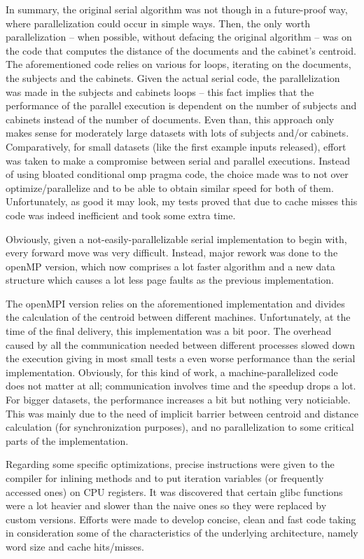 \documentclass[times, 10pt,twocolumn]{article}
\begin{document}
	In summary, the original serial algorithm was not though in a future-proof way, where parallelization could occur in simple ways.
	Then, the only worth parallelization – when possible, without defacing the original algorithm –  was on the code that computes the distance of the documents and the cabinet's centroid. The aforementioned code relies on various for loops, iterating on the documents, the subjects and the cabinets. Given the actual serial code, the parallelization was made in the subjects and cabinets loops – this fact implies that the performance of the parallel execution is dependent on the number of subjects and cabinets instead of the number of documents. Even than, this approach only makes sense for moderately large datasets with lots of subjects and/or cabinets. Comparatively, for small datasets (like the first example inputs released), effort was taken to make a compromise between serial and parallel executions. Instead of using bloated conditional omp pragma code, the choice made was to not over optimize/parallelize and to be able to obtain similar speed for both of them. Unfortunately, as good it may look, my tests proved that due to cache misses this code was indeed inefficient and took some extra time.

	Obviously, given a not-easily-parallelizable serial implementation to begin with, every forward move was very difficult. Instead, major rework was done to the openMP version, which now comprises a lot faster algorithm and a new data structure which causes a lot less page faults as the previous implementation.

	The openMPI version relies on the aforementioned implementation and divides the calculation of the centroid between different machines. Unfortunately, at the time of the final delivery, this implementation was a bit poor. The overhead caused by all the communication needed between different processes slowed down the execution giving in most small tests a even worse performance than the serial implementation. Obviously, for this kind of work, a machine-parallelized code does not matter at all; communication involves time and the speedup drops a lot. For bigger datasets, the performance increases a bit but nothing very noticiable. This was mainly due to the need of implicit barrier between centroid and distance calculation (for synchronization purposes), and no parallelization to some critical parts of the implementation.	

	Regarding some specific optimizations, precise instructions were given to the compiler for inlining methods and to put iteration variables (or frequently accessed ones) on CPU registers. It was discovered that certain glibc functions were a lot heavier and slower than the naive ones so they were replaced by custom versions. Efforts were made to develop concise, clean and fast code taking in consideration some of the characteristics of the underlying architecture, namely word size and cache hits/misses.
\end{document}
